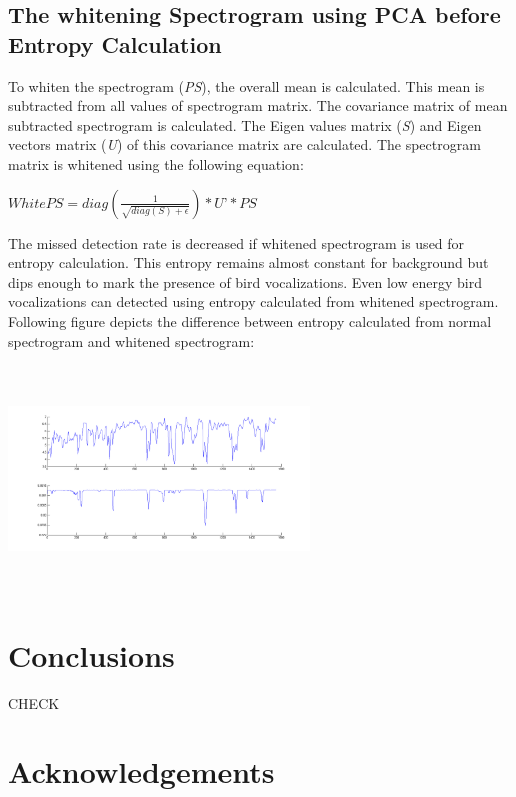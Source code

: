 \documentclass[a4paper]{article}
\begin{document}
\subsection{The whitening Spectrogram using PCA before Entropy Calculation}

To whiten the spectrogram (\textit{PS}), the overall mean is calculated. This mean is subtracted from all values of spectrogram matrix. The covariance matrix of mean subtracted spectrogram is calculated. The Eigen values matrix (\textit{S}) and Eigen vectors matrix (\textit{U}) of this covariance matrix are calculated. The spectrogram matrix is whitened using the following equation:

\hspace{1cm}

$WhitePS=diag(\frac{1}{\sqrt{diag(S)+\epsilon}})*\textit{U'}*\textit{PS}$


\hspace{1cm}

The missed detection rate is decreased if whitened spectrogram is used for entropy calculation. This entropy remains almost constant for background but dips enough to mark the presence of bird vocalizations. Even low energy bird vocalizations can detected using entropy calculated from whitened spectrogram. Following figure depicts the difference between entropy calculated from normal spectrogram and whitened spectrogram:

\includegraphics[width=8cm, height=6cm]{entropy}  

  \section{Conclusions}

CHECK

  \section{Acknowledgements}
  
\end{document}
